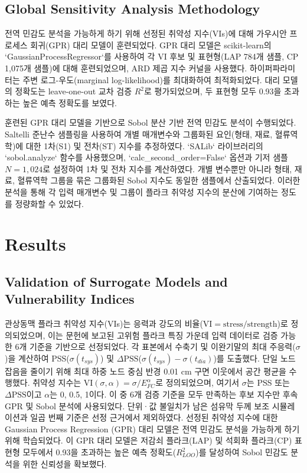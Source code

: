 \documentclass[preprint,12pt]{elsarticle}
\begin{document}
\subsection{Global Sensitivity Analysis Methodology}
전역 민감도 분석을 가능하게 하기 위해 선정된 취약성 지수(VIs)에 대해 가우시안 프로세스 회귀(GPR) 대리 모델이 훈련되었다. GPR 대리 모델은 scikit-learn의 `GaussianProcessRegressor`를 사용하여 각 VI 후보 및 표현형(LAP 784개 샘플, CP 1,075개 샘플)에 대해 훈련되었으며, ARD 제곱 지수 커널을 사용했다. 하이퍼파라미터는 주변 로그-우도(marginal log-likelihood)를 최대화하여 최적화되었다. 대리 모델의 정확도는 leave-one-out 교차 검증 $R^2$로 평가되었으며, 두 표현형 모두 0.93을 초과하는 높은 예측 정확도를 보였다.

훈련된 GPR 대리 모델을 기반으로 Sobol 분산 기반 전역 민감도 분석이 수행되었다. Saltelli 준난수 샘플링을 사용하여 개별 매개변수와 그룹화된 요인(형태, 재료, 혈류역학)에 대한 1차(S1) 및 전차(ST) 지수를 추정하였다. `SALib` 라이브러리의 `sobol.analyze` 함수를 사용했으며, `calc\_second\_order=False` 옵션과 기저 샘플 $N=1,024$로 설정하여 1차 및 전차 지수를 계산하였다. 개별 변수뿐만 아니라 형태, 재료, 혈류역학 그룹을 묶은 그룹화된 Sobol 지수도 동일한 샘플에서 산출되었다. 이러한 분석을 통해 각 입력 매개변수 및 그룹이 플라크 취약성 지수의 분산에 기여하는 정도를 정량화할 수 있었다.

\section{Results}

\subsection{Validation of Surrogate Models and Vulnerability Indices}
관상동맥 플라크 취약성 지수(VIs)는 응력과 강도의 비율($\text{VI} = \text{stress}/\text{strength}$)로 정의되었으며, 이는 문헌에 보고된 고위험 플라크 특징 가운데 입력 데이터로 검증 가능한 6개 기준을 기반으로 선정되었다. 각 표본에서 수축기 및 이완기말의 최대 주응력($\sigma$)을 계산하여 PSS($\sigma(t_{sys})$) 및 $\Delta\text{PSS}$($\sigma(t_{sys}) - \sigma(t_{dia})$)를 도출했다. 단일 노드 잡음을 줄이기 위해 최대 하중 노드 중심 반경 0.01 cm 구면 이웃에서 공간 평균을 수행했다. 취약성 지수는 $\text{VI}(\sigma, \alpha) = \sigma/E_{FC}^\alpha$로 정의되었으며, 여기서 $\sigma$는 PSS 또는 $\Delta\text{PSS}$이고 $\alpha$는 0, 0.5, 1이다. 이 중 6개 검증 기준을 모두 만족하는 후보 지수만 후속 GPR 및 Sobol 분석에 사용되었다. 단위·값 불일치가 남은 섬유막 두께 보조 시뮬레이션과 일곱 번째 기준은 선정 근거에서 제외하였다. 선정된 취약성 지수에 대한 Gaussian Process Regression (GPR) 대리 모델은 전역 민감도 분석을 가능하게 하기 위해 학습되었다. 이 GPR 대리 모델은 저감쇠 플라크(LAP) 및 석회화 플라크(CP) 표현형 모두에서 0.93을 초과하는 높은 예측 정확도($R^2_{LOO}$)를 달성하여 Sobol 민감도 분석을 위한 신뢰성을 확보했다.
\end{document}
